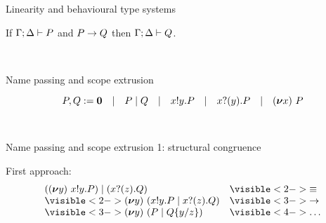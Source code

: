 \documentclass[aspectratio=169,hyperref={pdfpagelabels=false}]{beamer}
\begin{document}
\begin{frame}{Linearity and behavioural type systems}
  
  \begin{theorem}
  If \( \Gamma;\Delta \vdash P \) and \( P \rightarrow Q \) then \( \Gamma;\Delta \vdash Q \).
  \end{theorem}

  \ \\
\end{frame}




\begin{frame}{Name passing and scope extrusion}

  \[P,Q := \bm{0}\quad|\quad P \mid Q\quad|\quad x ! y . P\quad|\quad x ? (y) . P\quad|\quad (\bm{\nu} x)~P\]

  \ \\

  
      
\end{frame}

\begin{frame}{Name passing and scope extrusion 1: structural congruence}

  First approach:\ \\

  \[
  \begin{array}{ll}
    \Ppar{(\Pres{y}{\Pout{x}{y}{P}})}{(\Pin{x}{z}{Q})} & \visible<2->{\equiv}\\
    \visible<2->{\Pres{y}{ (\Ppar{\Pout{x}{y}{P}}{\Pin{x}{z}{Q}})}} & \visible<3->{\rightarrow}\\
    \visible<3->{\Pres{y}{(\Ppar{P}{\subst{Q}{y}{z}})}} & \visible<4->{\dots}
  \end{array}
  \]
  \ \\ \ \\

      
\end{frame}
\end{document}
